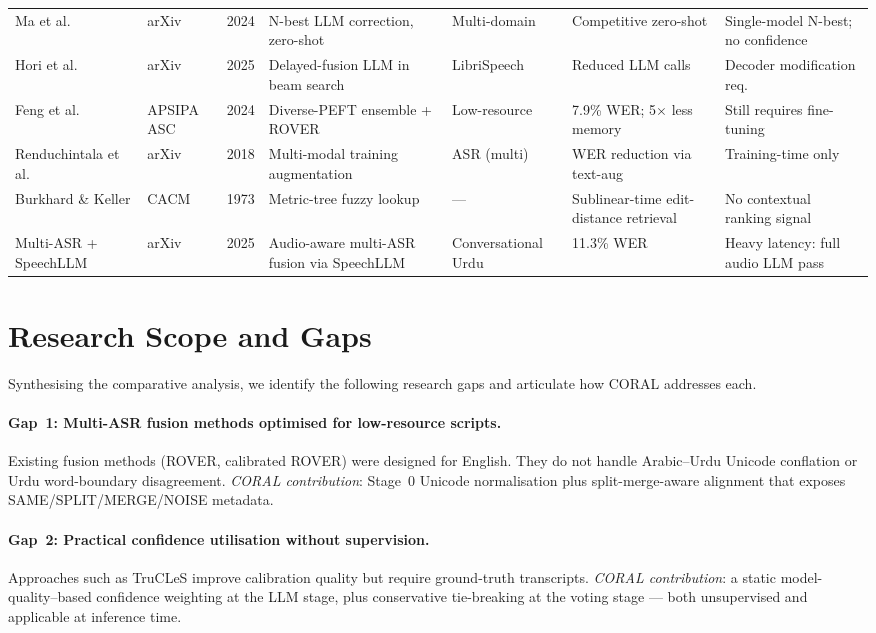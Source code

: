 \begin{landscape}
\begin{longtable}{p{3.3cm}p{2.8cm}p{1.2cm}p{3.4cm}p{3.4cm}p{2.8cm}p{2.8cm}}
Ma et al.\ \cite{ma2024asr} & arXiv & 2024 & N-best LLM correction, zero-shot & Multi-domain & Competitive zero-shot & Single-model N-best; no confidence \\
Hori et al.\ \cite{hori2025delayed} & arXiv & 2025 & Delayed-fusion LLM in beam search & LibriSpeech & Reduced LLM calls & Decoder modification req.\ \\
Feng et al.\ \cite{feng2024low} & APSIPA ASC & 2024 & Diverse-PEFT ensemble + ROVER & Low-resource & 7.9\% WER; 5$\times$ less memory & Still requires fine-tuning \\
Renduchintala et al.\ \cite{renduchintala2018mmda} & arXiv & 2018 & Multi-modal training augmentation & ASR (multi) & WER reduction via text-aug & Training-time only \\
Burkhard \& Keller \cite{burkhard1973bk} & CACM & 1973 & Metric-tree fuzzy lookup & --- & Sublinear-time edit-distance retrieval & No contextual ranking signal \\
Multi-ASR + SpeechLLM \cite{anon2025speechllm} & arXiv & 2025 & Audio-aware multi-ASR fusion via SpeechLLM & Conversational Urdu & 11.3\% WER & Heavy latency: full audio LLM pass \\
\bottomrule
\end{longtable}
\end{landscape}

\section{Research Scope and Gaps}
\label{sec:research-gap}

Synthesising the comparative analysis, we identify the following research gaps and articulate how CORAL addresses each.

\paragraph{Gap~1: Multi-ASR fusion methods optimised for low-resource scripts.} Existing fusion methods (ROVER, calibrated ROVER) were designed for English. They do not handle Arabic--Urdu Unicode conflation or Urdu word-boundary disagreement. \emph{CORAL contribution}: Stage~0 Unicode normalisation plus split-merge-aware alignment that exposes SAME/SPLIT/MERGE/NOISE metadata.

\paragraph{Gap~2: Practical confidence utilisation without supervision.} Approaches such as TruCLeS improve calibration quality but require ground-truth transcripts. \emph{CORAL contribution}: a static model-quality--based confidence weighting at the LLM stage, plus conservative tie-breaking at the voting stage --- both unsupervised and applicable at inference time.

